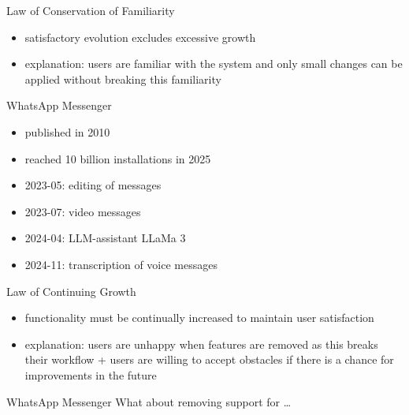 \begin{frame}{\insertsubsection}
	\begin{fancycolumns}
		\begin{definition}{Law of Conservation of Familiarity\mysource{\lehmanslaws}}
			\begin{itemize}
				\item satisfactory evolution excludes excessive growth %
				\item explanation: users are familiar with the system and only small changes can be applied without breaking this familiarity
			\end{itemize}
		\end{definition}
		\begin{example}{WhatsApp Messenger}
			\begin{itemize}
				\item published in 2010
				\item reached 10 billion installations in 2025
				\item 2023-05: editing of messages
				\item 2023-07: video messages
				\item 2024-04: LLM-assistant LLaMa 3
				\item 2024-11: transcription of voice messages
			\end{itemize}
		\end{example}
		\nextcolumn
		\begin{definition}{Law of Continuing Growth\mysource{\lehmanslaws}}
			\begin{itemize}
				\item functionality must be continually increased to maintain user satisfaction %
				\item explanation: users are unhappy when features are removed as this breaks their workflow + users are willing to accept obstacles if there is a chance for improvements in the future
			\end{itemize}
		\end{definition}
		\begin{example}{WhatsApp Messenger}
			What about removing support for \ldots


\end{example}
\end{fancycolumns}
\end{frame}
